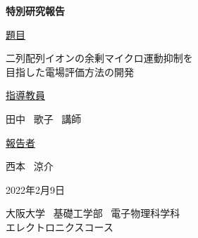 \begin{titlepage}
	\begin{center}
		\vspace{25truemm}
		{\huge \bf{特別研究報告}\par}
		\vspace{10truemm}
		{\huge \underline{題目}\par}
		\vspace{5truemm}
		{\huge 二列配列イオンの余剰マイクロ運動抑制を\\目指した電場評価方法の開発\par}
		\vspace{15truemm}
		{\huge \underline{指導教員}\par}
		\vspace{5truemm}
		{\huge 田中 \ 歌子 \ 講師\par}
		\vspace{15truemm}
		{\huge \underline{報告者}\par}
		\vspace{5truemm}
		{\huge 西本 \ 涼介\par}
		\vspace{15truemm}
		{\huge 2022年2月9日\par}
		\vspace{15truemm}
		{\huge 大阪大学 \ 基礎工学部 \ 電子物理科学科 \\ エレクトロニクスコース}
	\end{center}
\end{titlepage}